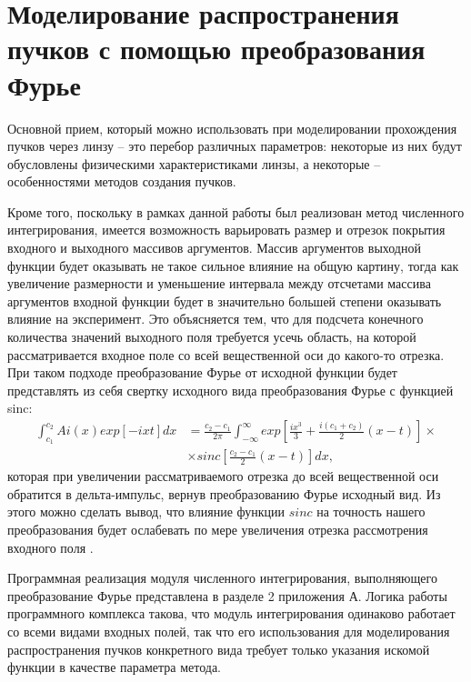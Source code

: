 		\section{\nohyphens{Моделирование распространения пучков с помощью преобразования Фурье}}
		{
			Основной прием, который можно использовать при моделировании
прохождения пучков через линзу – это перебор различных параметров:
некоторые из них будут обусловлены физическими характеристиками линзы, а
некоторые – особенностями методов создания пучков. 

	Кроме того, поскольку в рамках данной работы был реализован метод
численного интегрирования, имеется возможность варьировать размер и отрезок покрытия
входного и выходного массивов аргументов. Массив аргументов выходной
функции будет оказывать не такое сильное влияние на общую картину, тогда
как увеличение размерности и уменьшение интервала между отсчетами массива
аргументов входной функции будет в значительно большей степени оказывать
влияние на эксперимент. Это объясняется тем, что для подсчета конечного
количества значений выходного поля требуется усечь область, на которой
рассматривается входное поле со всей вещественной оси до какого-то отрезка.
При таком подходе преобразование Фурье от исходной функции будет
представлять из себя свертку исходного вида преобразования Фурье с
функцией sinc:
	\begin{align*}
	\int^{c_2}_{c_1} Ai(x)exp[-ixt]dx &= \frac{c_2-c_1}{2\pi}\int^{\infty}_{-\infty}exp[\frac{ix^3}{3} + \frac{i(c_1+c_2)}{2}(x-t)] \times\\
	& \times sinc[\frac{c_2-c_1}{2}(x-t)]dx,
	\end{align*}
	 которая при увеличении рассматриваемого отрезка до всей
вещественной оси обратится в дельта-импульс, вернув преобразованию Фурье
исходный вид. Из этого можно сделать вывод, что влияние функции $sinc$ на
точность нашего преобразования будет ослабевать по мере увеличения отрезка
рассмотрения входного поля \cite{Khonina_2011}.

	Программная реализация модуля численного интегрирования,
выполняющего преобразование Фурье представлена в разделе 2 приложения А. Логика
работы программного комплекса такова, что модуль интегрирования одинаково
работает со всеми видами входных полей, так что его использования для
моделирования распространения пучков конкретного вида требует только
указания искомой функции в качестве параметра метода.

}
